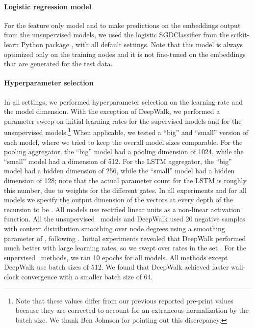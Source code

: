 \paragraph{Logistic regression model}
For the feature only model and to make predictions on the embeddings output from the unsupervised models, 
we used the logistic SGDClassifier from the scikit-learn Python package \cite{scikit-learn}, with all default settings.
Note that this model is always optimized only on the training nodes and it is not fine-tuned on the embeddings that are generated for the test data.


\paragraph{Hyperparameter selection}

In all settings, we performed hyperparameter selection on the learning rate and the model dimension.
With the exception of DeepWalk, we performed a parameter sweep on initial learning rates  for the supervised models and  for the unsupervised models.\footnote{Note that these values differ from our previous reported pre-print values because they are corrected to account for an extraneous normalization by the batch size. We thank Ben Johnson for pointing out this discrepancy.}
When applicable, we tested a ``big'' and ``small'' version of each model, where we tried to keep the overall model sizes comparable.
For the pooling aggregator, the ``big'' model had a pooling dimension of 1024, while the ``small'' model had a dimension of  512.
For the LSTM aggregator, the ``big'' model had a hidden dimension of 256, while the ``small'' model had a hidden dimension of 128; note that the actual parameter count for the LSTM is roughly  this number, due to weights for the different gates. 
In all experiments and for all models we specify the output dimension of the  vectors at every depth  of the recursion to be . 
All models use rectified linear units as a non-linear activation function.
All the unsupervised \name\ models and DeepWalk used 20 negative samples with context distribution smoothing over node degrees using a smoothing parameter of , following \cite{grover2016node2vec,mikolov2013distributed,perozzi2014deepwalk}.
Initial experiments revealed that DeepWalk performed much better with large learning rates, so we swept over rates in the set . 
For the supervised \name\ methods, we ran 10 epochs for all models. 
All methods except DeepWalk use batch sizes of 512.
We found that DeepWalk achieved faster wall-clock convergence with a smaller batch size of 64. 

